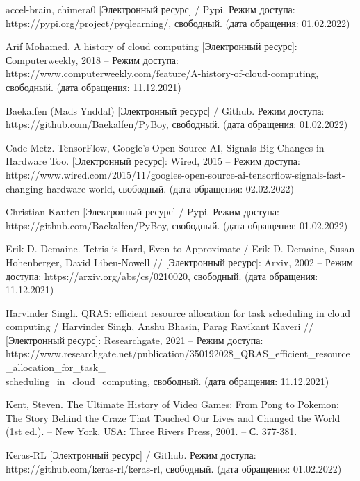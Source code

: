 \documentclass{article}
\begin{document}
\newpage
\begin{center}
\begin{thebibliography}{}
 accel-brain, chimera0 [Электронный ресурс] / Pypi. Режим доступа: https://pypi.org/project/pyqlearning/, свободный. (дата обращения: 01.02.2022)

 Arif Mohamed. A history of cloud computing [Электронный ресурс]: Сomputerweekly, 2018 – Режим доступа: https://www.computerweekly.com/feature/A-history-of-cloud-computing, свободный. (дата обращения: 11.12.2021)

 Baekalfen (Mads Ynddal) [Электронный ресурс] / Github. Режим доступа: https://github.com/Baekalfen/PyBoy, свободный. (дата обращения: 01.02.2022)

 Cade Metz. TensorFlow, Google's Open Source AI, Signals Big Changes in Hardware Too. [Электронный ресурс]: Wired, 2015 – Режим доступа: https://www.wired.com/2015/11/googles-open-source-ai-tensorflow-signals-fast-changing-hardware-world, свободный. (дата обращения: 02.02.2022) 

 Christian Kauten [Электронный ресурс] / Pypi. Режим доступа: https://github.com/Baekalfen/PyBoy, свободный. (дата обращения: 01.02.2022)

 Erik D. Demaine. Tetris is Hard, Even to Approximate / Erik D. Demaine, Susan Hohenberger, David Liben-Nowell // [Электронный ресурс]: Arxiv, 2002 – Режим доступа: https://arxiv.org/abs/cs/0210020, свободный. (дата обращения: 11.12.2021)

 Harvinder Singh. QRAS: efficient resource allocation for task scheduling in cloud computing / Harvinder Singh, Anshu Bhasin, Parag Ravikant Kaveri // [Электронный ресурс]: Researchgate, 2021 – Режим доступа: https://www.researchgate.net/publication/350192028\_QRAS\_efficient\_resource\_allocation\_for\_task\_\\scheduling\_in\_cloud\_computing, свободный. (дата обращения: 11.12.2021)

 Kent, Steven. The Ultimate History of Video Games: From Pong to Pokemon: The Story Behind the Craze That Touched Our Lives and Changed the World (1st ed.). – New York, USA: Three Rivers Press, 2001. – С. 377-381.

 Keras-RL [Электронный ресурс] / Github. Режим доступа: https://github.com/keras-rl/keras-rl, свободный. (дата обращения: 01.02.2022)


\end{thebibliography}
\end{center}
\end{document}
